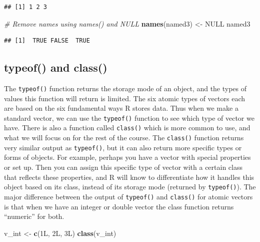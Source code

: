 \documentclass[
]{book}
\newenvironment{Shaded}{\begin{snugshade}}{\end{snugshade}}
\newcommand{\CommentTok}[1]{\textcolor[rgb]{0.56,0.35,0.01}{\textit{#1}}}
\newcommand{\KeywordTok}[1]{\textcolor[rgb]{0.13,0.29,0.53}{\textbf{#1}}}
\newcommand{\NormalTok}[1]{#1}
\newcommand{\OtherTok}[1]{\textcolor[rgb]{0.56,0.35,0.01}{#1}}
\newcommand{\StringTok}[1]{\textcolor[rgb]{0.31,0.60,0.02}{#1}}
\begin{document}
\begin{verbatim}
## [1] 1 2 3
\end{verbatim}

\begin{Shaded}
\begin{Highlighting}[]
\CommentTok{# Remove names using names() and NULL}
\KeywordTok{names}\NormalTok{(named3) <-}\StringTok{ }\OtherTok{NULL}
\NormalTok{named3}
\end{Highlighting}
\end{Shaded}

\begin{verbatim}
## [1]  TRUE FALSE  TRUE
\end{verbatim}

\hypertarget{typeof-and-class}{%
\subsection{typeof() and class()}\label{typeof-and-class}}

The \texttt{typeof()} function returns the storage mode of an object, and the types of values this function will return is limited. The six atomic types of vectors each are based on the six fundamental ways R stores data. Thus when we make a standard vector, we can use the \texttt{typeof()} function to see which type of vector we have. There is also a function called \texttt{class()} which is more common to use, and what we will focus on for the rest of the course. The \texttt{class()} function returns very similar output as \texttt{typeof()}, but it can also return more specific types or forms of objects. For example, perhaps you have a vector with special properties or set up. Then you can assign this specific type of vector with a certain class that reflects these properties, and R will know to differentiate how it handles this object based on its class, instead of its storage mode (returned by \texttt{typeof()}). The major difference between the output of \texttt{typeof()} and \texttt{class()} for atomic vectors is that when we have an integer or double vector the class function returns ``numeric'' for both.

\begin{Shaded}
\begin{Highlighting}[]
\NormalTok{v_int <-}\StringTok{ }\KeywordTok{c}\NormalTok{(1L, 2L, 3L)}
\KeywordTok{class}\NormalTok{(v_int)}
\end{Highlighting}
\end{Shaded}
\end{document}
